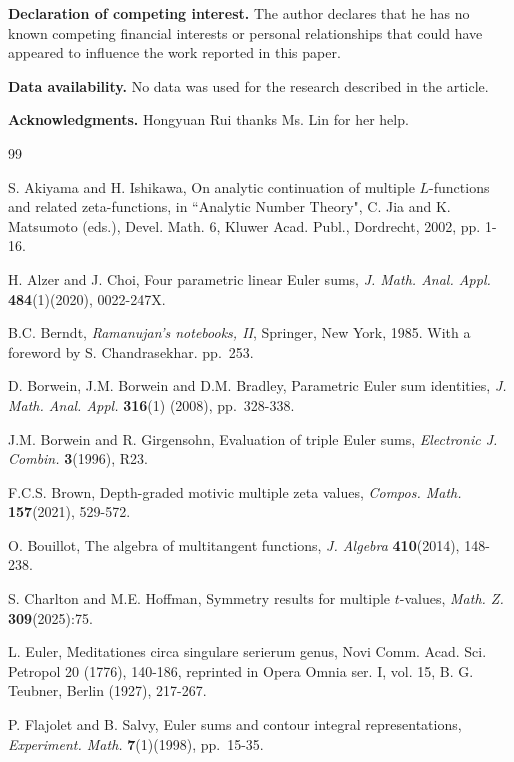 \documentclass[11pt]{article}
\theoremstyle{plain}
\theoremstyle{definition}
\begin{document}
\medskip



{\bf Declaration of competing interest.}
The author declares that he has no known competing financial interests or personal relationships that could have
appeared to influence the work reported in this paper.

{\bf Data availability.}
No data was used for the research described in the article.

{\bf Acknowledgments.}
Hongyuan Rui thanks Ms. Lin for her help.

\begin{thebibliography}{99}

S. Akiyama and H. Ishikawa, On analytic continuation of multiple $L$-functions and related zeta-functions, in ``Analytic Number Theory", C. Jia and K. Matsumoto (eds.), Devel. Math. 6, Kluwer Acad. Publ., Dordrecht, 2002, pp. 1-16.

H. Alzer and J. Choi, Four parametric linear Euler sums, \emph{J. Math. Anal. Appl.} \textbf{484}(1)(2020), 0022-247X.

B.C. Berndt, \emph{Ramanujan's notebooks, II}, Springer, New York, 1985. With a foreword by S. Chandrasekhar. pp.\ 253.

D. Borwein, J.M. Borwein and  D.M. Bradley, Parametric Euler sum identities, \emph{J. Math. Anal. Appl.} \textbf{316}(1) (2008), pp.\ 328-338.

J.M. Borwein and R. Girgensohn, Evaluation of triple Euler sums, \emph{Electronic J. Combin.} \textbf{3}(1996), R23.

F.C.S. Brown, Depth-graded motivic multiple zeta values, \emph{Compos. Math.} \textbf{157}(2021), 529-572.

O. Bouillot, The algebra of multitangent functions, \emph{J. Algebra} \textbf{410}(2014), 148-238.

S. Charlton and M.E. Hoffman, Symmetry results for multiple $t$-values, \emph{Math. Z.} \textbf{309}(2025):75.

L. Euler, Meditationes circa singulare serierum genus, Novi Comm. Acad. Sci. Petropol 20 (1776), 140-186, reprinted in Opera Omnia ser. I, vol. 15, B. G. Teubner,
Berlin (1927), 217-267.

P. Flajolet and B. Salvy, Euler sums and contour integral representations, \emph{Experiment. Math.} \textbf{7}(1)(1998), pp.\  15-35.


\end{thebibliography}
\end{document}
